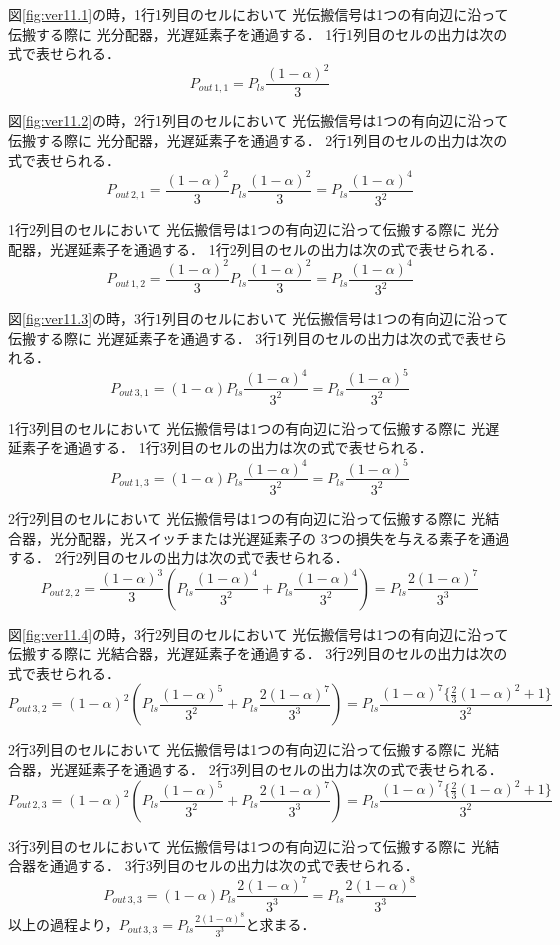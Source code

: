 \begin{itemize}
図\ref{fig:ver11.1}の時，1行1列目のセルにおいて
光伝搬信号は1つの有向辺に沿って伝搬する際に
光分配器，光遅延素子を通過する．
1行1列目のセルの出力は次の式で表せられる． 
$$P_{out\,1,1}=P_{ls}\frac{(1-\alpha)^2}{3}$$

図\ref{fig:ver11.2}の時，2行1列目のセルにおいて
光伝搬信号は1つの有向辺に沿って伝搬する際に
光分配器，光遅延素子を通過する．
2行1列目のセルの出力は次の式で表せられる． 
$$P_{out\,2,1}=\frac{(1-\alpha)^2}{3}P_{ls}\frac{(1-\alpha)^2}{3}
=P_{ls}\frac{(1-\alpha)^4}{3^2}$$

1行2列目のセルにおいて
光伝搬信号は1つの有向辺に沿って伝搬する際に
光分配器，光遅延素子を通過する．
1行2列目のセルの出力は次の式で表せられる．
$$P_{out\,1,2}=\frac{(1-\alpha)^2}{3}P_{ls}\frac{(1-\alpha)^2}{3}
=P_{ls}\frac{(1-\alpha)^4}{3^2}$$

図\ref{fig:ver11.3}の時，3行1列目のセルにおいて
光伝搬信号は1つの有向辺に沿って伝搬する際に
光遅延素子を通過する．
3行1列目のセルの出力は次の式で表せられる．
$$
P_{out\,3,1}=(1-\alpha)P_{ls}\frac{(1-\alpha)^4}{3^2}=P_{ls}\frac{(1-\alpha)^5}{3^2}
$$

1行3列目のセルにおいて
光伝搬信号は1つの有向辺に沿って伝搬する際に
光遅延素子を通過する．
1行3列目のセルの出力は次の式で表せられる．
$$
P_{out\,1,3}=(1-\alpha)P_{ls}\frac{(1-\alpha)^4}{3^2}=P_{ls}\frac{(1-\alpha)^5}{3^2}
$$

2行2列目のセルにおいて
光伝搬信号は1つの有向辺に沿って伝搬する際に
光結合器，光分配器，光スイッチまたは光遅延素子の
3つの損失を与える素子を通過する．
2行2列目のセルの出力は次の式で表せられる．
$$P_{out\,2,2}=\frac{(1-\alpha)^3}{3}(P_{ls}\frac{(1-\alpha)^4}{3^2}+P_{ls}\frac{(1-\alpha)^4}{3^2})
=P_{ls}\frac{2(1-\alpha)^7}{3^3}$$

図\ref{fig:ver11.4}の時，3行2列目のセルにおいて
光伝搬信号は1つの有向辺に沿って伝搬する際に
光結合器，光遅延素子を通過する．
3行2列目のセルの出力は次の式で表せられる．
$$P_{out\,3,2}=(1-\alpha)^2(P_{ls}\frac{(1-\alpha)^5}{3^2}+P_{ls}\frac{2(1-\alpha)^7}{3^3})
=P_{ls}\frac{(1-\alpha)^7\bigl\{\frac{2}{3}(1-\alpha)^2+1\bigl\}}{3^2}$$

2行3列目のセルにおいて
光伝搬信号は1つの有向辺に沿って伝搬する際に
光結合器，光遅延素子を通過する．
2行3列目のセルの出力は次の式で表せられる．
$$P_{out\,2,3}=(1-\alpha)^2(P_{ls}\frac{(1-\alpha)^5}{3^2}+P_{ls}\frac{2(1-\alpha)^7}{3^3})
=P_{ls}\frac{(1-\alpha)^7\bigl\{\frac{2}{3}(1-\alpha)^2+1\bigl\}}{3^2}$$

3行3列目のセルにおいて
光伝搬信号は1つの有向辺に沿って伝搬する際に
光結合器を通過する．
3行3列目のセルの出力は次の式で表せられる．
$$P_{out\,3,3}=(1-\alpha)P_{ls}\frac{2(1-\alpha)^7}{3^3}
=P_{ls}\frac{2(1-\alpha)^8}{3^3}
$$
以上の過程より，$P_{out\,3,3}=P_{ls}\frac{2(1-\alpha)^8}{3^3}$と求まる．


\end{itemize}
